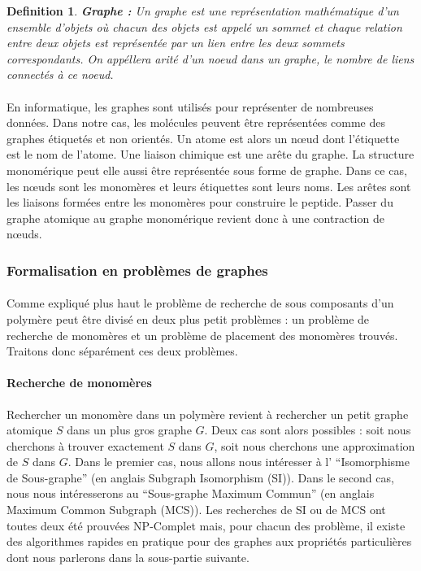 \documentclass[12pt,french,twoside]{report}
\begin{document}
\newtheorem{definition}{Definition}
\begin{definition}\textbf{Graphe :}
 Un graphe est une représentation mathématique d'un ensemble d'objets où chacun des objets est appelé un sommet et
 chaque relation entre deux objets est représentée par un lien entre les deux sommets correspondants.
 On appéllera arité d'un noeud dans un graphe, le nombre de liens connectés à ce noeud.
\end{definition}

\paragraph{}En informatique, les graphes sont utilisés pour représenter de nombreuses données.
Dans notre cas, les molécules peuvent être représentées comme des graphes étiquetés et non orientés.
Un atome est alors un n\oe{}ud dont l'étiquette est le nom de l'atome.
Une liaison chimique est une arête du graphe.
La structure monomérique peut elle aussi être représentée sous forme de graphe.
Dans ce cas, les n\oe{}uds sont les monomères et leurs étiquettes sont leurs noms.
Les arêtes sont les liaisons formées entre les monomères pour construire le peptide.
Passer du graphe atomique au graphe monomérique revient donc à une contraction de n\oe{}uds.


\subsubsection{Formalisation en problèmes de graphes}

\paragraph{}Comme expliqué plus haut le problème de recherche de sous composants d'un polymère peut être divisé en deux
plus petit problèmes : un problème de recherche de monomères et un problème de placement des monomères trouvés. Traitons
donc séparément ces deux problèmes.

\paragraph{Recherche de monomères}Rechercher un monomère dans un polymère revient à rechercher un petit graphe atomique
$S$ dans un plus gros graphe $G$. Deux cas sont alors possibles : soit nous cherchons à trouver exactement $S$ dans
$G$, soit nous cherchons une approximation de $S$ dans $G$. Dans le premier cas, nous allons nous intéresser à l'
``Isomorphisme de Sous-graphe'' (en anglais Subgraph Isomorphism (SI)). Dans le second cas, nous nous intéresserons au
``Sous-graphe Maximum Commun'' (en anglais Maximum Common Subgraph (MCS)). Les recherches de SI ou de MCS ont toutes
deux été prouvées NP-Complet mais, pour chacun des problème, il existe des algorithmes rapides en pratique pour des graphes
aux propriétés particulières dont nous parlerons dans la sous-partie suivante.
\end{document}
